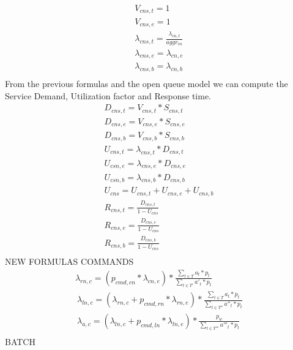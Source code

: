 \documentclass[11pt]{article}
\begin{document}
\begin{equation}
	\begin{array}{l}
		V_{cns, t} = 1 \\
		V_{cns, e} = 1 \\
		\lambda_{cns, t} = \frac{\lambda_{cn,t}}{aggr_{cn}} \\
		\lambda_{cns, e} = \lambda_{cn,e} \\
		\lambda_{cns, b} = \lambda_{cn,b} \\
	\end{array}
\end{equation}
From the previous formulas and the open queue model we can compute the Service Demand, Utilization factor and Response time.
\begin{equation}
	\begin{array}{l}
		D_{cns, t} = V_{cns, t} * S_{cns, t} \\
		D_{cns, e} = V_{cns, e} * S_{cns, e} \\
		D_{cns, b} = V_{cns, b} * S_{cns, b} \\
		U_{cns, t} = \lambda_{cns, t} * D_{cns, t} \\
		U_{csn, e} = \lambda_{cns, e} * D_{cns, e} \\
		U_{csn, b} = \lambda_{cns, b} * D_{cns, b} \\
		U_{cns} = U_{cns, t} + U_{cns, e} + U_{cns, b}\\
		R_{cns, t} = \frac{D_{cns, t}}{1 - U_{cns}} \\
		R_{cns, e} = \frac{D_{cns, e}}{1 - U_{cns}} \\
		R_{cns, b} = \frac{D_{cns, b}}{1 - U_{cns}} \\
	\end{array}
\end{equation}
NEW FORMULAS
COMMANDS
\begin{equation}
	\begin{array}{l}
		\lambda_{rn,c}= (p_{cmd,cn} * \lambda_{cn, e})* \frac{\sum\limits_{t \in T}{a_{t} * p_{t}}}{\sum\limits_{t \in T'}{a'_{t} * p_{t}}} \\\

		\lambda_{ln,c}= (\lambda_{rn, c} + p_{cmd,rn} * \lambda_{rn, e}) *\frac{\sum\limits_{t \in T}{a_{t} * p_{t}}}{\sum\limits_{t \in T''}{a''_{t} * p_{t}}} \\\

		\lambda_{a,c}= (\lambda_{ln, c}+p_{cmd,ln} * \lambda_{ln, e}) * \frac{p_{w}}{\sum\limits_{t \in T'''}{a'''_{t} * p_{t}}}   \\\
\end{array}
\end{equation}
BATCH
\end{document}
